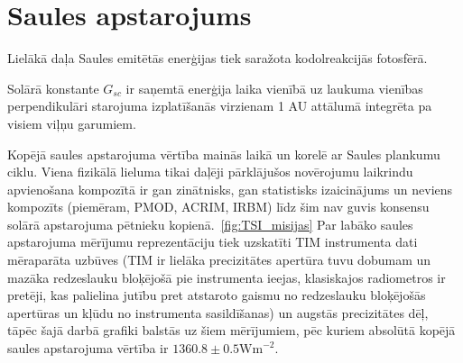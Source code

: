 
\section{Saules apstarojums}

Lielākā daļa Saules emitētās enerģijas tiek saražota kodolreakcijās fotosfērā.



Solārā konstante $G_{sc}$ ir saņemtā enerģija laika vienībā uz laukuma vienības perpendikulāri starojuma izplatīšanās virzienam 1 AU attālumā integrēta pa visiem viļņu garumiem.\cite{ThermalProcesses}

Kopējā saules apstarojuma vērtība mainās laikā un korelē ar Saules plankumu ciklu.
Viena fizikālā lieluma tikai daļēji pārklājušos novērojumu laikrindu apvienošana kompozītā ir gan zinātnisks, gan statistisks izaicinājums un neviens kompozīts (piemēram, PMOD, ACRIM, IRBM) līdz šim nav guvis konsensu solārā apstarojuma pētnieku kopienā.~\ref{fig:TSI_misijas} Par labāko saules apstarojuma mērījumu reprezentāciju tiek uzskatīti TIM instrumenta dati mēraparāta uzbūves (TIM ir lielāka precizitātes apertūra tuvu dobumam un mazāka redzeslauku bloķējošā pie instrumenta ieejas, klasiskajos radiometros ir pretēji, kas palielina jutību pret atstaroto gaismu no redzeslauku bloķējošās apertūras un kļūdu no instrumenta sasildīšanas) un augstās precizitātes dēļ, tāpēc šajā darbā grafiki balstās uz šiem mērījumiem, pēc kuriem absolūtā kopējā saules apstarojuma vērtība ir $1360.8 \pm 0.5 \textrm{Wm}^{-2}$.\cite{Frohlich2012}




